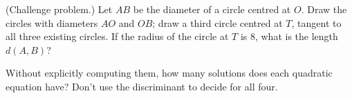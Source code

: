 \begin{questions}
  \question (Challenge problem.) Let $ AB $ be the diameter of a circle centred at $ O $. Draw the circles with diameters $ AO $ and $ OB $; draw a
            third circle centred at $ T $, tangent to all three existing circles. If the radius of the circle at $ T $ is 8,
            what is the length $ d(A,B) $?

  \question Without explicitly computing them, how many solutions does each quadratic equation have? Don't use the discriminant
            to decide for all four.
\end{questions}
